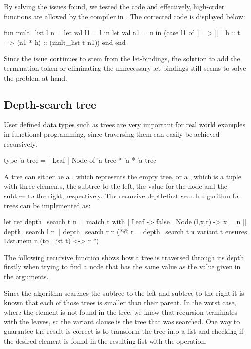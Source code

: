 By solving the issues found, we tested the code and effectively, high-order functions are allowed by the compiler in \cml. The corrected 
code is displayed below:

\begin{cakeml}
fun mult_list l n = let val l1 = l in
    let val n1 = n in
    (case l1 of
        [] => []
    | h :: t => (n1 * h) :: (mult_list t n1))
    end end
\end{cakeml}

Since the issue continues to stem from the let-bindings, the solution to add the termination token or eliminating the unnecessary 
let-bindings still seems to solve the problem at hand.

\subsection{Depth-search tree}

User defined data types such as trees are very important for real world examples in functional programming, since traversing them
can easily be achieved recursively. 

\begin{gospell}
type 'a tree =
    | Leaf
    | Node of 'a tree * 'a * 'a tree
\end{gospell}

A tree can either be a , which represents the empty tree, or a , which is a tuple with three elements, 
the subtree to the left, the value for the node and the subtree to the right, respectively. The recursive depth-first search algorithm 
for trees can be implemented as:

\begin{gospell}
let rec depth_search t n = 
  match t with
  | Leaf -> false
  | Node (l,x,r) -> x = n || depth_search l n || depth_search r n
(*@
  r = depth_search t n
  variant t
  ensures List.mem n (to_list t) <-> r
*)
\end{gospell}

The following recursive function  shows how a tree is traversed through its depth firstly when trying to find
a node that has the same value as the value given in the arguments.

Since the algorithm searches the subtree to the left and subtree to the right it is known that each of those trees is smaller than their
parent. In the worst case, where the element is not found in the tree, we know that recursion terminates with the leaves, so the variant 
clause is the tree that was searched. One way to guarantee the result is correct is to transform the tree into a list and checking if
the desired element is found in the resulting list with the  operation.

